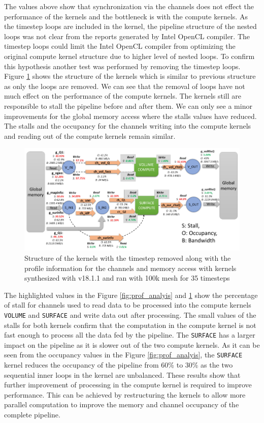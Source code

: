 The values above show that synchronization via the channels does not effect
the performance of the kernels and the bottleneck is with the compute
kernels. As the timestep loops are included in the kernel,  the pipeline
structure of the nested loops was not clear from the reports generated
by Intel OpenCL compiler. The timestep loops could limit the Intel OpenCL compiler
from optimizing the original compute kernel structure due to higher level of nested
loops. To confirm this hypothesis another test was performed by removing the timestep
loops. Figure \ref{fig:prof_analyis_2} shows the structure of the kernels which
is similar to previous structure as only the loops are removed. We can see that
the removal of loops have not much effect on the performance of the compute kernels.
The kernels still are responsible to stall the pipeline before and after them.
We can only see a minor improvements for the global memory access where the stalls
values have reduced. The stalls and the occupancy for the channels writing into the compute kernels
and reading out of the compute kernels remain similar.

\begin{figure}[]%
    \centering
    \includegraphics[width=1.0\textwidth]{images/bottleneck_analysis_noloops}
    \caption{Structure of the kernels with the timestep removed along with the profile
    information for the channels and memory access with kernels synthesized
    with v18.1.1 and ran with 100k mesh for 35 timesteps}
    \label{fig:prof_analyis_2}
\end{figure}

The highlighted values in the Figure \ref{fig:prof_analyis} and \ref{fig:prof_analyis_2}
show the percentage of stall for channels used to read data to be processed into the
compute kernels \texttt{VOLUME} and \texttt{SURFACE}
and write data out after processing. The small values of the stalls for both kernels
confirm that the computation in the compute kernel is not fast enough to process
all the data fed by the pipeline. The \texttt{SURFACE} has a larger impact on the pipeline as it is slower
out of the two compute kernels. As it can be seen from the occupancy values in the Figure \ref{fig:prof_analyis},
the \texttt{SURFACE} kernel reduces the occupancy of the pipeline from 60\% to 30\% as the
two sequential inner loops in the kernel are unbalanced.
These results show that further improvement of processing in the compute kernel
is required to improve performance. This can be achieved by restructuring the kernels to allow
more parallel computation to improve the memory and channel occupancy of the complete
pipeline.